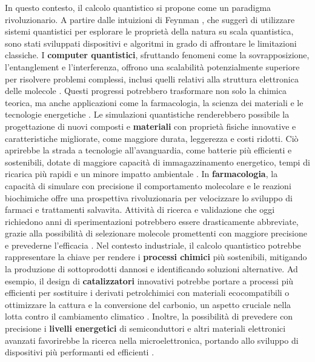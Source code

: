 In questo contesto, il calcolo quantistico si propone come un paradigma rivoluzionario. A partire dalle intuizioni di Feynman \cite{feynman_1982}, che suggerì di utilizzare sistemi quantistici per esplorare le proprietà della natura su scala quantistica, sono stati sviluppati dispositivi e algoritmi in grado di affrontare le limitazioni classiche. I \textbf{computer quantistici}, sfruttando fenomeni come la sovrapposizione, l’entanglement e l’interferenza, offrono una scalabilità potenzialmente superiore per risolvere problemi complessi, inclusi quelli relativi alla struttura elettronica delle molecole \cite{Cao_2019}. Questi progressi potrebbero trasformare non solo la chimica teorica, ma anche applicazioni come la farmacologia, la scienza dei materiali e le tecnologie energetiche \cite{Daley_2022,weidman_2024}.
Le simulazioni quantistiche renderebbero possibile la progettazione di nuovi composti e \textbf{materiali} con proprietà fisiche innovative e caratteristiche migliorate, come maggiore durata, leggerezza e costi ridotti. Ciò aprirebbe la strada a tecnologie all’avanguardia, come batterie più efficienti e sostenibili, dotate di maggiore capacità di immagazzinamento energetico, tempi di ricarica più rapidi e un minore impatto ambientale \cite{Zini_2023_battery}.
In \textbf{farmacologia}, la capacità di simulare con precisione il comportamento molecolare e le reazioni biochimiche offre una prospettiva rivoluzionaria per velocizzare lo sviluppo di farmaci e trattamenti salvavita. Attività di ricerca e validazione che oggi richiedono anni di sperimentazioni potrebbero essere drasticamente abbreviate, grazie alla possibilità di selezionare molecole promettenti con maggiore precisione e prevederne l’efficacia \cite{Johnson_2014,Pal_2024}.
Nel contesto industriale, il calcolo quantistico potrebbe rappresentare la chiave per rendere i \textbf{processi chimici} più sostenibili, mitigando la produzione di sottoprodotti dannosi e identificando soluzioni alternative. Ad esempio, il design di \textbf{catalizzatori} innovativi potrebbe portare a processi più efficienti per sostituire i derivati petrolchimici con materiali ecocompatibili o ottimizzare la cattura e la conversione del carbonio, un aspetto cruciale nella lotta contro il cambiamento climatico \cite{Paudel_2022,Reiher_2017}.
Inoltre, la possibilità di prevedere con precisione i \textbf{livelli energetici} di semiconduttori e altri materiali elettronici avanzati favorirebbe la ricerca nella microelettronica, portando allo sviluppo di dispositivi più performanti ed efficienti \cite{Wang_2024}.

